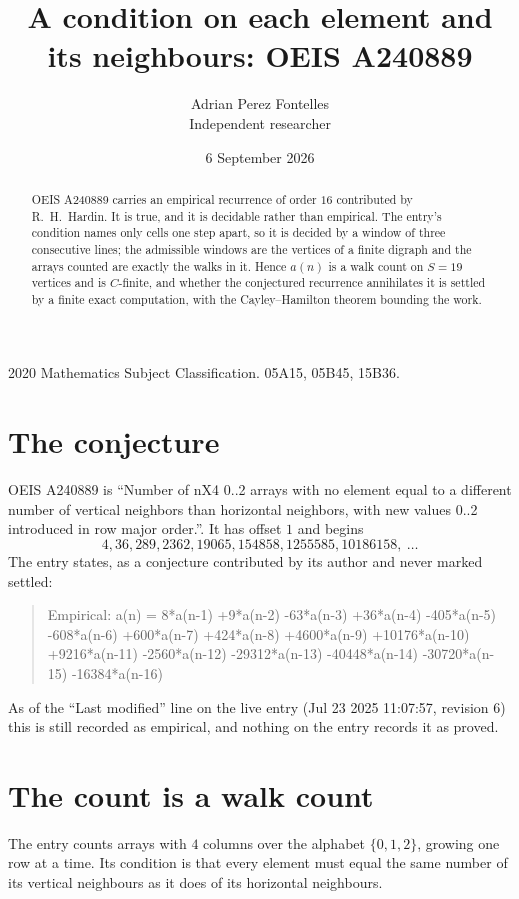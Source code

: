 \documentclass[11pt,a4paper]{article}
\title{A condition on each element and its neighbours: OEIS A240889}
\author{Adrian Perez Fontelles\\ \small Independent researcher}
\date{6 September 2026}
\theoremstyle{plain}
\theoremstyle{definition}
\begin{document}
\maketitle

\begin{abstract}
OEIS A240889 carries an empirical recurrence of order $16$ contributed by R.~H.~Hardin. It is
true, and it is decidable rather than empirical. The entry's condition names only cells one step apart, so it is decided by a window of
three consecutive lines; the
admissible windows are the vertices of a finite digraph and the arrays counted are exactly the
walks in it. Hence $a(n)$ is a walk count on $S=19$ vertices and is $C$-finite, and whether the
conjectured recurrence annihilates it is settled by a finite exact computation, with the
Cayley--Hamilton theorem bounding the work.
\end{abstract}

\noindent\small 2020 Mathematics Subject Classification. 05A15, 05B45, 15B36.\normalsize

\section{The conjecture}

OEIS A240889 is ``Number of nX4 0..2 arrays with no element equal to a different number of vertical neighbors than horizontal neighbors, with new values 0..2 introduced in row major order.''. It has offset $1$ and begins
\[
4, 36, 289, 2362, 19065, 154858, 1255585, 10186158,\ \dots
\]
The entry states, as a conjecture contributed by its author and never marked settled:
\begin{quote}
Empirical: a(n) = 8*a(n-1) +9*a(n-2) -63*a(n-3) +36*a(n-4) -405*a(n-5) -608*a(n-6) +600*a(n-7) +424*a(n-8) +4600*a(n-9) +10176*a(n-10) +9216*a(n-11) -2560*a(n-12) -29312*a(n-13) -40448*a(n-14) -30720*a(n-15) -16384*a(n-16)
\end{quote}
As of the ``Last modified'' line on the live entry (Jul 23 2025 11:07:57, revision 6) this is still
recorded as empirical, and nothing on the entry records it as proved.

\section{The count is a walk count}

The entry counts arrays with $4$ columns over the alphabet $\{0,1,2\}$, growing one row at a time. Its condition is that every element must equal the same number of its vertical neighbours as it does of its horizontal neighbours.
\end{document}
